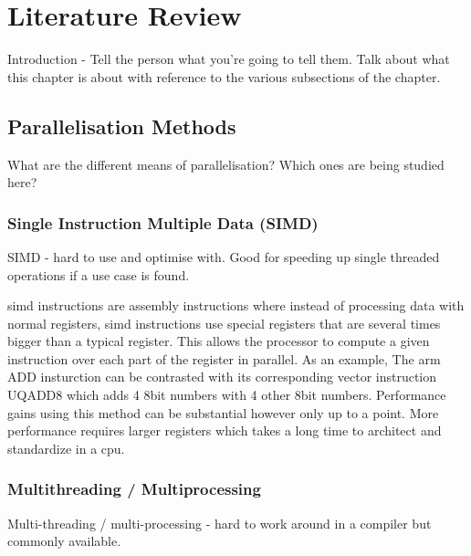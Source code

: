 \chapter{Literature Review} \label{litreview}
\begin{sectionplan}
Introduction - Tell the person what you're going to tell them. Talk about what
this chapter is about with reference to the various subsections of the chapter.
\end{sectionplan}

\section{Parallelisation Methods} \label{parallelisation_methods}
\begin{sectionplan}
     What are the different means of parallelisation? Which ones are being
studied here?
\end{sectionplan}

\subsection{Single Instruction Multiple Data (SIMD)}
\begin{sectionplan}
	SIMD - hard to use and optimise with. Good for speeding up single threaded
	operations if a use case is found.
\end{sectionplan}

\ac{simd} instructions are assembly instructions where instead of processing data
with normal registers, \ac{simd} instructions use special registers that are
several times bigger than a typical register. This allows the processor to
compute a given instruction over each part of the register in parallel. As
an example, The arm ADD insturction can be contrasted with its corresponding
vector instruction UQADD8 which adds 4 8bit numbers with 4 other 8bit numbers.
Performance gains using this method can be substantial however only up to a
point. More performance requires larger registers which takes a long time to
architect and standardize in a \ac{cpu}.

\subsection{Multithreading / Multiprocessing}
\begin{sectionplan}
     Multi-threading / multi-processing - hard to work around in a compiler but
commonly available.
\end{sectionplan}

